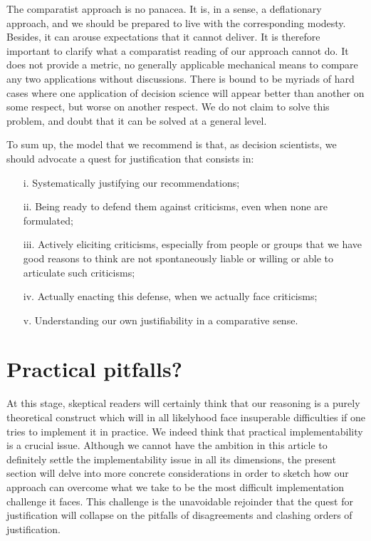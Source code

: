 \documentclass[preprint,11pt]{elsarticle}
\begin{document}
The comparatist approach is no panacea. It is, in a sense, a deflationary approach, and we should be prepared to live with the corresponding modesty. Besides, it can arouse expectations that it cannot deliver. It is therefore important to clarify what a comparatist reading of our approach cannot do. It does not provide a metric, no generally applicable mechanical means to compare any two applications without discussions. There is bound to be myriads of hard cases where one application of decision science will appear better than another on some respect, but worse on another respect. We do not claim to solve this problem, and doubt that it can be solved at a general level.

To sum up, the model that we recommend is that, as decision scientists, we should advocate a quest for justification that consists in:
\begin{itemize}
\item[i.]	Systematically justifying our recommendations;
\item[ii.]	Being ready to defend them against criticisms, even when none are formulated;
\item[iii.]	Actively eliciting criticisms, especially from people or groups that we have good reasons to think are not spontaneously liable or willing or able to articulate such criticisms;
\item[iv.]	Actually enacting this defense, when we actually face criticisms;
\item[v.]	Understanding our own justifiability in a comparative sense.
\end{itemize}

\section{Practical pitfalls?}
\noindent At this stage, skeptical readers will certainly think that our reasoning is a purely theoretical construct which will in all likelyhood face insuperable difficulties if one tries to implement it in practice. We indeed think that practical implementability is a crucial issue. Although we cannot have the ambition in this article to definitely settle the implementability issue in all its dimensions, the present section will delve into more concrete considerations in order to sketch how our approach can overcome what we take to be the most difficult implementation challenge it faces. This challenge is the unavoidable rejoinder that the quest for justification will collapse on the pitfalls of disagreements and clashing orders of justification.
\end{document}
